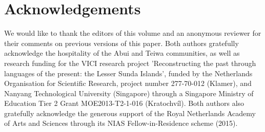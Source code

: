 \documentclass[output=paper]{LSP/langsci}
\begin{document}
\section*{Acknowledgements} 
We would like to thank the editors of this volume and an anonymous reviewer for their comments on previous versions of this paper. Both authors gratefully acknowledge the hospitality of the Abui and  Teiwa communities, as well as research funding for the VICI research project 'Reconstructing the past through languages of the present: the Lesser Sunda Islands', funded by the Netherlands Organisation for Scientific Research, project number 277-70-012 (Klamer), and Nanyang Technological University (Singapore) through a Singapore Ministry of Education Tier 2 Grant MOE2013-T2-1-016 (Kratochvíl). Both authors also gratefully acknowledge the generous support of the Royal Netherlands Academy of Arts and Sciences through its NIAS Fellow-in-Residence scheme (2015).
\end{document}
